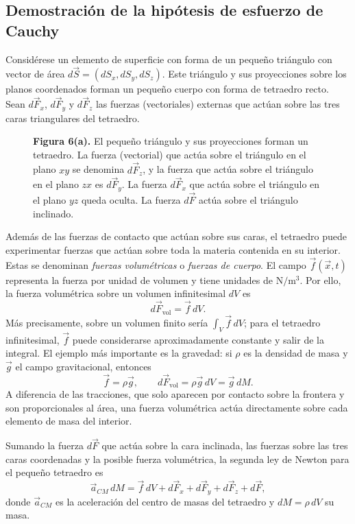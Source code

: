 \subsection{Demostración de la hipótesis de esfuerzo de Cauchy}

Considérese un elemento de superficie con forma de un pequeño triángulo con vector de área $d\vec{S} = (dS_x, dS_y, dS_z)$. Este triángulo y sus proyecciones sobre los planos coordenados forman un pequeño cuerpo con forma de tetraedro recto. Sean $d\vec{F}_x$, $d\vec{F}_y$ y $d\vec{F}_z$ las fuerzas (vectoriales) externas que actúan sobre las tres caras triangulares del tetraedro.

\begin{figure}[H]
\centering

\par\medskip
\textbf{Figura 6(a).} El pequeño triángulo y sus proyecciones forman un tetraedro. La fuerza (vectorial) que actúa sobre el triángulo en el plano $xy$ se denomina $d\vec{F}_z$, y la fuerza que actúa sobre el triángulo en el plano $zx$ es $d\vec{F}_y$. La fuerza $d\vec{F}_x$ que actúa sobre el triángulo en el plano $yz$ queda oculta. La fuerza $d\vec{F}$ actúa sobre el triángulo inclinado.
\end{figure}

Además de las fuerzas de contacto que actúan sobre sus caras, el tetraedro puede experimentar fuerzas que actúan sobre toda la materia contenida en su interior. Estas se denominan \emph{fuerzas volumétricas} o \emph{fuerzas de cuerpo}. El campo $\vec f(\vec x,t)$ representa la fuerza por unidad de volumen y tiene unidades de $\mathrm{N/m^3}$. Por ello, la fuerza volumétrica sobre un volumen infinitesimal $dV$ es
\[
d\vec F_{\mathrm{vol}}=\vec f\,dV.
\]
Más precisamente, sobre un volumen finito sería $\int_V\vec f\,dV$; para el tetraedro infinitesimal, $\vec f$ puede considerarse aproximadamente constante y salir de la integral. El ejemplo más importante es la gravedad: si $\rho$ es la densidad de masa y $\vec g$ el campo gravitacional, entonces
\[
\vec f=\rho\vec g,
\qquad
d\vec F_{\mathrm{vol}}=\rho\vec g\,dV=\vec g\,dM.
\]
A diferencia de las tracciones, que solo aparecen por contacto sobre la frontera y son proporcionales al área, una fuerza volumétrica actúa directamente sobre cada elemento de masa del interior.

Sumando la fuerza $d\vec F$ que actúa sobre la cara inclinada, las fuerzas sobre las tres caras coordenadas y la posible fuerza volumétrica, la segunda ley de Newton para el pequeño tetraedro es
$$ \vec{a}_{CM}\,dM = \vec{f}\,dV + d\vec{F}_x + d\vec{F}_y + d\vec{F}_z + d\vec{F}, $$
donde $\vec{a}_{CM}$ es la aceleración del centro de masas del tetraedro y $dM = \rho\,dV$ su masa.

